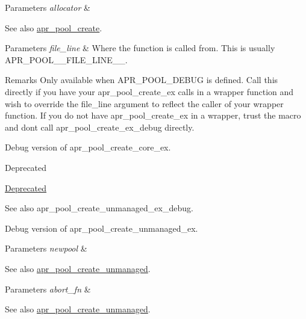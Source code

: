 \begin{DoxyParams}{Parameters}
{\em allocator} & \\
\hline
\end{DoxyParams}
\begin{DoxySeeAlso}{See also}
\hyperlink{group__apr__pools_gaa7c40921aae156b665e82b0a66991a39}{apr\+\_\+pool\+\_\+create}. 
\end{DoxySeeAlso}

\begin{DoxyParams}{Parameters}
{\em file\+\_\+line} & Where the function is called from. This is usually A\+P\+R\+\_\+\+P\+O\+O\+L\+\_\+\+\_\+\+F\+I\+L\+E\+\_\+\+L\+I\+N\+E\+\_\+\+\_\+. \\
\hline
\end{DoxyParams}
\begin{DoxyRemark}{Remarks}
Only available when A\+P\+R\+\_\+\+P\+O\+O\+L\+\_\+\+D\+E\+B\+UG is defined. Call this directly if you have your apr\+\_\+pool\+\_\+create\+\_\+ex calls in a wrapper function and wish to override the file\+\_\+line argument to reflect the caller of your wrapper function. If you do not have apr\+\_\+pool\+\_\+create\+\_\+ex in a wrapper, trust the macro and don\textquotesingle{}t call apr\+\_\+pool\+\_\+create\+\_\+ex\+\_\+debug directly.
\end{DoxyRemark}
Debug version of apr\+\_\+pool\+\_\+create\+\_\+core\+\_\+ex. \begin{DoxyRefDesc}{Deprecated}
\item[\hyperlink{deprecated__deprecated000042}{Deprecated}]\end{DoxyRefDesc}
\begin{DoxySeeAlso}{See also}
apr\+\_\+pool\+\_\+create\+\_\+unmanaged\+\_\+ex\+\_\+debug.
\end{DoxySeeAlso}
Debug version of apr\+\_\+pool\+\_\+create\+\_\+unmanaged\+\_\+ex. 
\begin{DoxyParams}{Parameters}
{\em newpool} & \\
\hline
\end{DoxyParams}
\begin{DoxySeeAlso}{See also}
\hyperlink{group__apr__pools_ga03a06feb239bed9edd79a4f59679d56b}{apr\+\_\+pool\+\_\+create\+\_\+unmanaged}. 
\end{DoxySeeAlso}

\begin{DoxyParams}{Parameters}
{\em abort\+\_\+fn} & \\
\hline
\end{DoxyParams}
\begin{DoxySeeAlso}{See also}
\hyperlink{group__apr__pools_ga03a06feb239bed9edd79a4f59679d56b}{apr\+\_\+pool\+\_\+create\+\_\+unmanaged}. 
\end{DoxySeeAlso}

